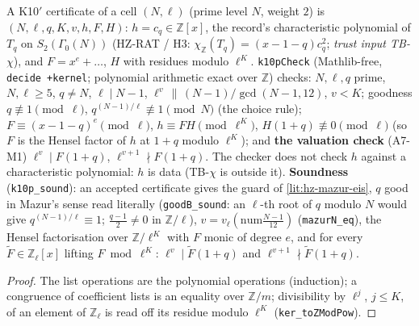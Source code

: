 \begin{definition}\label{chk:hz-k10p}
  \leanok
  A K10$'$ certificate of a cell $(N,\ell)$ (prime level $N$, weight $2$) is $(N,\ell,q,K,v,h,F,H)$: $h=c_q\in\mathbb Z[x]$, the record's
  characteristic polynomial of $T_q$ on $S_2(\Gamma_0(N))$ (HZ-RAT / H3: $\chi_{\mathbb Z}(T_q)=(x-1-q)c_q^2$; \emph{trust input TB-$\chi$}), and
  $F=x^e+\dots$, $H$ with residues modulo $\ell^K$. \texttt{k10pCheck} (Mathlib-free, \texttt{decide +kernel}; polynomial arithmetic exact over
  $\mathbb Z$) checks: $N,\ell,q$ prime, $N,\ell\ge5$, $q\ne N$, $\ell\mid N-1$, $\ell^v\,\|\,(N-1)/\gcd(N-1,12)$, $v<K$; goodness
  $q\not\equiv1\pmod\ell$, $q^{(N-1)/\ell}\not\equiv1\pmod N$ (the choice rule); $F\equiv(x-1-q)^e\pmod\ell$, $h\equiv FH\pmod{\ell^K}$,
  $H(1+q)\not\equiv0\pmod\ell$ (so $F$ is the Hensel factor of $h$ at $1+q$ modulo $\ell^K$); and \textbf{the valuation check} (A7-M1)
  $\ell^v\mid F(1+q)$, $\ell^{v+1}\nmid F(1+q)$. The checker does not check $h$ against a characteristic polynomial: $h$ is data
  (TB-$\chi$ is outside it). \textbf{Soundness} (\texttt{k10p\_sound}): an accepted certificate gives the guard of
  \ref{lit:hz-mazur-eis}, $q$ good in Mazur's sense read literally (\texttt{goodB\_sound}: an $\ell$-th root of $q$ modulo $N$ would give
  $q^{(N-1)/\ell}\equiv1$; $\frac{q-1}2\ne0$ in $\mathbb Z/\ell$), $v=v_\ell(\mathrm{num}\frac{N-1}{12})$ (\texttt{mazurN\_eq}), the Hensel
  factorisation over $\mathbb Z/\ell^K$ with $F$ monic of degree $e$, and for every $\tilde F\in\mathbb Z_\ell[x]$ lifting $F\bmod\ell^K$:
  $\ell^v\mid\tilde F(1+q)$ and $\ell^{v+1}\nmid\tilde F(1+q)$.
\end{definition}
\begin{proof}
  \leanok
  The list operations are the polynomial operations (induction); a congruence of coefficient lists is an equality over $\mathbb Z/m$;
  divisibility by $\ell^j$, $j\le K$, of an element of $\mathbb Z_\ell$ is read off its residue modulo $\ell^K$ (\texttt{ker\_toZModPow}).
\end{proof}

